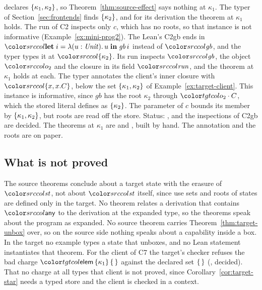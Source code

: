 \begin{example}\label{ex:source-run}
 declares $\{\kappa_1,\kappa_2\}$, so Theorem~\ref{thm:source-effect} says nothing at $\kappa_1$. The typer of Section~\ref{sec:frontends} finds $\{\kappa_2\}$, and for its derivation the theorem at $\kappa_1$ holds. The run of C2 inspects only $c$, which has no roots, so that instance is not informative (Example~\ref{ex:mini-prog2}). The Lean's C2gb ends in $\src{\klet i = \lambda(u : \Unit).\,u \kin \mathit{gb}\,i}$ instead of $\src{\mathit{gb}}$, and the typer types it at $\src{\cset{\kappa_2}}$. Its run inspects $\src{\mathit{gb}}$, the object $\src{o_2}$ and the closure in its field $\src{\mathit{run}}$, and the theorem at $\kappa_1$ holds at each. The typer annotates the client's inner closure with $\src{\cset{x, x.C}}$, below the set $\{\kappa_1,\kappa_2\}$ of Example~\ref{ex:target-client}. This instance is informative, since $\mathit{gb}$ has the root $\kappa_2$ through $\sel{o_2}{C}$, which the stored literal defines as $\{\kappa_2\}$. The parameter of $c$ bounds its member by $\{\kappa_1,\kappa_2\}$, but roots are read off the store. Status: ,  and the inspections of C2gb are decided. The theorems at $\kappa_1$ are  and , built by hand. The annotation and the roots are on paper.
\end{example}

\subsection{What is not proved}\label{sec:source-open}

The source theorems conclude about a target state with the erasure of $\src{\mathit{st}}$, not about $\src{\mathit{st}}$ itself, since use sets and roots of states are defined only in the target. No theorem relates a derivation that contains $\cany$ to the derivation at the expanded type, so the theorems speak about the program as expanded. No source theorem carries Theorem~\ref{thm:target-unbox} over, so on the source side nothing speaks about a capability inside a box. In the target no example types a state that unboxes, and no Lean statement instantiates that theorem. For the client of C7 the target's checker refuses the bad charge $\ev{elem}\,\cset{\kappa_1}\,\cempty$ against the declared set $\{\,\}$ (, decided). That no charge at all types that client is not proved, since Corollary~\ref{cor:target-star} needs a typed store and the client is checked in a context.

